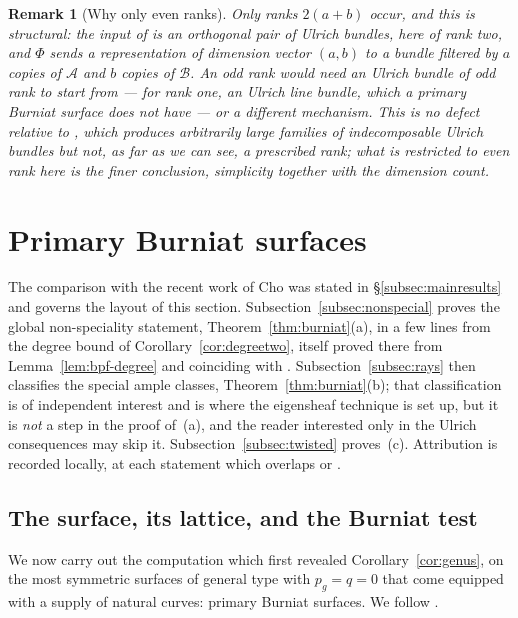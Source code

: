 \documentclass[10pt,a4paper]{amsart}
\newtheorem{remark}[theorem]{Remark}
\begin{document}
\begin{remark}[Why only even ranks]\label{rem:evenonly}
Only ranks $2(a+b)$ occur, and this is structural: the input of \cite[Thm.~A]{FPL} is an orthogonal \emph{pair} of Ulrich bundles, here of rank two, and $\Phi$ sends a representation of dimension vector $(a,b)$ to a bundle filtered by $a$ copies of $\mathcal A$ and $b$ copies of $\mathcal B$. An odd rank would need an Ulrich bundle of odd rank to start from --- for rank one, an Ulrich line bundle, which a primary Burniat surface does not have \cite{Cho26} --- or a different mechanism. This is no defect relative to \cite[Thm.~1.3]{Cas17}, which produces arbitrarily large families of indecomposable Ulrich bundles but not, as far as we can see, a prescribed rank; what is restricted to even rank here is the finer conclusion, simplicity together with the dimension count.
\end{remark}

\section{Primary Burniat surfaces}\label{sec:burniat}

The comparison with the recent work of Cho \cite{Cho26} was stated in \S\ref{subsec:mainresults} and governs the layout of this section. Subsection~\ref{subsec:nonspecial} proves the global non-speciality statement, Theorem~\ref{thm:burniat}(a), in a few lines from the degree bound of Corollary~\ref{cor:degreetwo}, itself proved there from Lemma~\ref{lem:bpf-degree} and coinciding with \cite[Prop.~5.4]{Cho26}. Subsection~\ref{subsec:rays} then classifies the special ample classes, Theorem~\ref{thm:burniat}(b); that classification is of independent interest and is where the eigensheaf technique is set up, but it is \emph{not} a step in the proof of~(a), and the reader interested only in the Ulrich consequences may skip it. Subsection~\ref{subsec:twisted} proves~(c). Attribution is recorded locally, at each statement which overlaps \cite{Cho26} or \cite{Ale16}.

\subsection{The surface, its lattice, and the Burniat test}\label{subsec:burniat}
We now carry out the computation which first revealed Corollary~\ref{cor:genus}, on the most symmetric surfaces of general type with $p_g=q=0$ that come equipped with a supply of natural curves: primary Burniat surfaces. We follow \cite{BC11,Pet77}.
\end{document}
